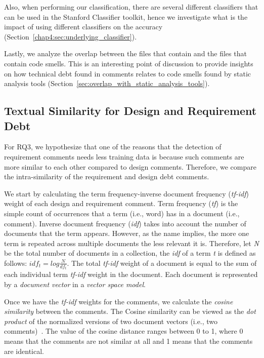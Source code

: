 Also, when performing our classification, there are several different classifiers that can be used in the Stanford Classifier toolkit, hence we investigate what is the impact of using different classifiers on the accuracy (Section~\ref{chap4:sec:underlying_classifier}).

Lastly, we analyze the overlap between the files that contain \SATD and the files that contain code smells. This is an interesting point of discussion to provide insights on how technical debt found in comments relates to code smells found by static analysis tools (Section~\ref{sec:overlap_with_static_analysis_tools}).

\subsection{Textual Similarity for Design and Requirement Debt}
\label{chap4:sec:textual_similarity}
For RQ3, we hypothesize that one of the reasons that the detection of requirement \SATD comments needs less training data is because such comments are more similar to each other compared to design \SATD comments. Therefore, we compare the intra-similarity of the requirement and design debt comments.

We start by calculating the term frequency-inverse document frequency (\textit{tf-idf}) weight of each design and requirement \SATD comment. Term frequency (\textit{tf}) is the simple count of occurrences that a term (i.e., word) has in a document (i.e., comment). Inverse document frequency (\textit{idf}) takes into account the number of documents that the term appears. However, as the name implies, the more one term is repeated across multiple documents the less relevant it is. Therefore, let \textit{N} be the total number of documents in a collection, the \textit{idf} of a term \textit{t} is defined as follows: \(idf_{t} = log\frac{N}{df_{t}}\). The total \textit{tf-idf} weight of a document is equal to the sum of each individual term \textit{tf-idf} weight in the document. Each document is represented by a \textit{document vector} in a \textit{vector space model}. 

Once we have the \textit{tf-idf} weights for the comments, we calculate the \textit{cosine similarity} between the comments. The Cosine similarity can be viewed as the \textit{dot product} of the normalized versions of two document vectors (i.e., two comments)~\cite{Manning2008book}. The value of the cosine distance ranges between 0 to 1, where 0 means that the comments are not similar at all and 1 means that the comments are identical.

